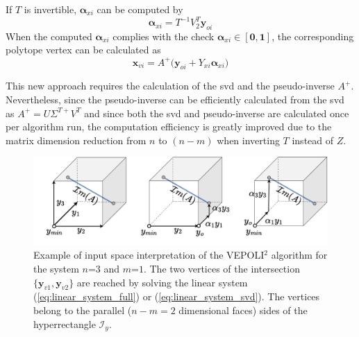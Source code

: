 If $T$ is invertible, $\bm{\alpha}_{xi}$ can be computed by
\begin{equation}
\bm{\alpha}_{xi} = T^{-1}V_2^T\bm{y}_{oi}
\label{eq:svd_linear_sys_step1}
\end{equation}
When the computed $\bm{\alpha}_{xi}$ complies with the check $\bm{\alpha}_{xi} \in [\bm{0},\bm{1}]$,  the corresponding polytope vertex can be calculated as
\begin{equation}
    \bm{x}_{vi} = A^{+} \big( \bm{y}_{oi} + Y_{xi}\bm{\alpha}_{xi}\big)
\label{eq:svd_linear_sys_step2}
\end{equation}

This new approach requires the calculation of the \gls{svd} and the pseudo-inverse $A^{+}$. Nevertheless, since the pseudo-inverse can be efficiently calculated from the \gls{svd} as $A^{+} = U\Sigma^{T+}V^T$ and since both the \gls{svd} and pseudo-inverse are calculated once per algorithm run, the computation efficiency is greatly improved due to the matrix dimension reduction from $n$ to $(n-m)$ when inverting $T$ instead of $Z$.

\begin{figure}[!t]
    \centering
    \includegraphics[width=0.9\linewidth]{Papers/images/intersection_example.pdf}
    \caption{Example of input space interpretation of the VEPOLI$^2$ algorithm for the system $n$=$3$ and $m$=$1$. The two vertices of the intersection $\{\bm{y}_{v1},\bm{y}_{v2}\}$ are reached by solving the linear system (\ref{eq:linear_system_full}) or (\ref{eq:linear_system_svd}). The vertices belong to the parallel ($n\!-\!m\!=\!2$ dimensional faces) sides of the hyperrectangle $\mathcal{I}_y$.  }
    \label{fig:intersection_example}
\end{figure}

